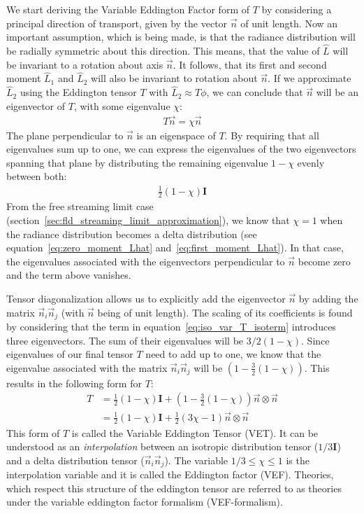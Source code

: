 We start deriving the Variable Eddington Factor form of $T$ by considering a principal direction of transport, given by the vector $\vec{n}$ of unit length. Now an important assumption, which is being made, is that the radiance distribution will be radially symmetric about this direction. This means, that the value of $\hat{L}$ will be invariant to a rotation about axis $\vec{n}$. It follows, that its first and second moment $\hat{L}_1$ and $\hat{L}_2$ will also be invariant to rotation about $\vec{n}$. If we approximate $\hat{L}_2$ using the Eddington tensor $T$ with $\hat{L}_2\approx T\phi$, we can conclude that $\vec{n}$ will be an eigenvector of $T$, with some eigenvalue $\chi$:
\begin{align*}
T\vec{n} = \chi\vec{n}
\end{align*}
The plane perpendicular to $\vec{n}$ is an eigenspace of $T$. By requiring that all eigenvalues sum up to one, we can express the eigenvalues of the two eigenvectors spanning that plane by distributing the remaining eigenvalue $1-\chi$ evenly between both:
\begin{align}
\frac{1}{2}\left(1-\chi\right)\mathbf{I}
\label{eq:iso_var_T_isoterm}
\end{align}
From the free streaming limit case (section~\ref{sec:fld_streaming_limit_approximation}), we know that $\chi=1$ when the radiance distribution becomes a delta distribution (see equation~\ref{eq:zero_moment_Lhat} and~\ref{eq:first_moment_Lhat}). In that case, the eigenvalues associated with the eigenvectors perpendicular to $\vec{n}$ become zero and the term above vanishes.

Tensor diagonalization allows us to explicitly add the eigenvector $\vec{n}$ by adding the matrix $\vec{n}_i\vec{n}_j$ (with $\vec{n}$ being of unit length). The scaling of its coefficients is found by considering that the term in equation~\ref{eq:iso_var_T_isoterm} introduces three eigenvectors. The sum of their eigenvalues will be $3/2(1-\chi)$. Since eigenvalues of our final tensor $T$ need to add up to one, we know that the eigenvalue associated with the matrix $\vec{n}_i\vec{n}_j$ will be $\left(1- \frac{3}{2}\left(1 - \chi\right)\right)$. This results in the following form for $T$:
\begin{align}
T &= \frac{1}{2}\left(1-\chi\right)\mathbf{I} + \left(1- \frac{3}{2}\left(1 - \chi\right)\right) \vec{n}\otimes\vec{n}
\nonumber
\\
&= \frac{1}{2}\left(1-\chi\right)\mathbf{I} + \frac{1}{2}\left(3\chi-1\right) \vec{n}\otimes\vec{n}
\label{eq:iso_var_T}
\end{align}
This form of $T$ is called the Variable Eddington Tensor (VET). It can be understood as an \emph{interpolation} between an isotropic distribution tensor ($1/3\mathbf{I}$) and a delta distribution tensor ($\vec{n}_i\vec{n}_j$). The variable $1/3 \le \chi \le 1$ is the interpolation variable and it is called the Eddington factor (VEF). Theories, which respect this structure of the eddington tensor are referred to as theories under the variable eddington factor formalism (VEF-formalism).

